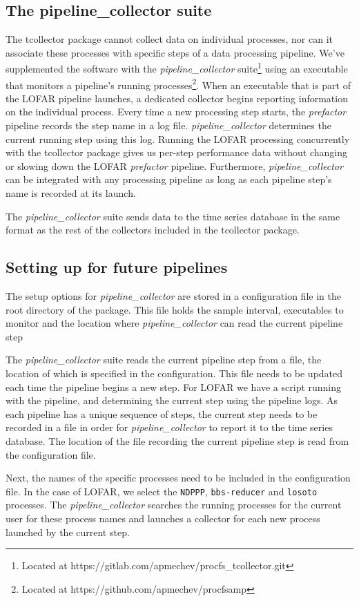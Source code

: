 \begin{subappendices}
\subsection{The pipeline\_collector suite}\label{sec:ch4_customcollectors}



The tcollector package cannot collect data on individual processes, nor can it associate these processes with specific steps of a data processing pipeline. We've supplemented the software with the \textit{pipeline\_collector} suite\footnote{Located at https://gitlab.com/apmechev/procfs\_tcollector.git} using an executable that monitors a pipeline's running processes\footnote{Located at https://github.com/apmechev/procfsamp}. When an executable that is part of the LOFAR pipeline launches, a dedicated collector begins reporting information on the individual process. Every time a new processing step starts, the \textit{prefactor} pipeline records the step name in a log file. \textit{pipeline\_collector} determines the current running step using this log. Running the LOFAR processing concurrently with the tcollector package gives us per-step performance data without changing or slowing down the LOFAR \textit{prefactor} pipeline. Furthermore, \textit{pipeline\_collector} can be integrated with any processing pipeline as long as each pipeline step's name is recorded at its launch. 

The \textit{pipeline\_collector} suite sends data to the time series database in the same format as the rest of the collectors included in the tcollector package. 

\subsection{Setting up for future pipelines}

The setup options for \textit{pipeline\_collector} are stored in a configuration file in the root directory of the package. This file holds the sample interval, executables to monitor and the location where \textit{pipeline\_collector} can read the current pipeline step

The \textit{pipeline\_collector} suite reads the current pipeline step from a file, the location of which is specified in the configuration. This file needs to be updated each time the pipeline begins a new step. For LOFAR we have a script running with the pipeline, and determining the current step using the pipeline logs. As each pipeline has a unique sequence of steps, the current step needs to be recorded in a file in order for \textit{pipeline\_collector} to report it to the time series database. The location of the file recording the current pipeline step is read from the configuration file. 

Next, the names of the specific processes need to be included in the configuration file. In the case of LOFAR, we select the \texttt{NDPPP}, \texttt{bbs-reducer} and \texttt{losoto} processes. The \textit{pipeline\_collector} searches the running processes for the current user for these process names and launches a collector for each new process launched by the current step. 
\end{subappendices}
